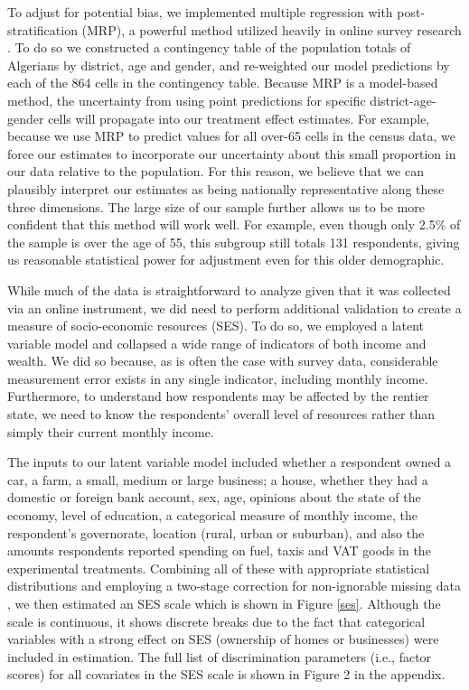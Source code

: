 \documentclass[12pt, letterpaper]{article}
\begin{document}
To adjust for potential bias, we implemented multiple regression with post-stratification (MRP), a powerful method utilized heavily in online survey research \parencite{wang_forecasting_2014}. To do so we constructed a contingency table of the population totals of Algerians by district, age and gender, and re-weighted our model predictions by each of the 864 cells in the contingency table. Because MRP is a model-based method, the uncertainty from using point predictions for specific district-age-gender cells will propagate into our treatment effect estimates. For example, because we use MRP to predict values for all over-65 cells in the census data, we force our estimates to incorporate our uncertainty about this small proportion in our data relative to the population. For this reason, we believe that we can plausibly interpret our estimates as being nationally representative along these three dimensions. The large size of our sample further allows us to be more confident that this method will work well. For example, even though only 2.5\% of the sample is over the age of 55, this subgroup still totals 131 respondents, giving us reasonable statistical power for adjustment even for this older demographic.



While much of the data is straightforward to analyze given that it was collected via an online instrument, we did need to perform additional validation to create a measure of socio-economic resources (SES). To do so, we employed a latent variable model \parencite{kubinec_generalized_2019} and collapsed a wide range of indicators of both income and wealth. We did so because, as is often the case with survey data, considerable measurement error exists in any single indicator, including monthly  income. Furthermore, to understand how respondents may be affected by the rentier state, we need to know the respondents' overall level of resources rather than simply their current  monthly income. 


The inputs to our latent variable model included whether a respondent owned a car, a farm, a small, medium or large business; a house, whether they had a domestic or foreign bank account, sex, age, opinions about the state of the economy, level of education, a categorical measure of monthly income, the respondent's governorate, location (rural, urban or suburban), and also the amounts respondents reported spending on fuel, taxis and VAT goods in the experimental treatments. Combining all of these with appropriate statistical distributions and employing a two-stage correction for non-ignorable missing data \parencite{kubinec_generalized_2019}, we then estimated an SES scale which is shown in Figure \ref{ses}. Although the scale is continuous, it shows discrete breaks due to the fact that categorical variables with a strong effect on SES (ownership of homes or businesses) were included in estimation. The full list of discrimination parameters (i.e., factor scores) for all covariates in the SES scale is shown in Figure 2 in the appendix.
\end{document}
